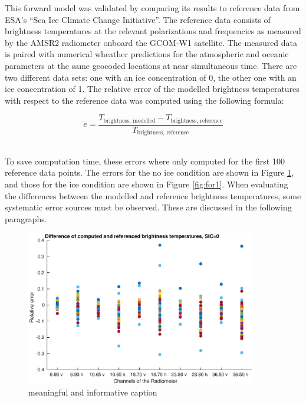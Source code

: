 \documentclass[11pt, a4paper]{article}
\begin{document}
This forward model was validated by comparing its results to reference data from ESA's ``Sea Ice Climate Change Initiative''. The reference data consists of brightness temperatures at the relevant polarizations and frequencies as measured by the AMSR2 radiometer onboard the GCOM-W1 satellite. %
The measured data is paired with numerical wheather predictions for the atmospheric and oceanic parameters at the same geocoded locations at near simultaneous time. There are two different data sets: one with an ice concentration of 0, the other one with an ice concentration of 1. The relative error of the modelled brightness temperatures with respect to the reference data was computed using the following formula:

\begin{equation}
e = \frac{T_\text{brightness, modelled} - T_\text{brightness, reference}}{T_\text{brightness, reference}}
\end{equation}

\ \\
To save computation time, these errors where only computed for the first 100 reference data points. The errors for the no ice condition are shown in Figure \ref{fig:for0}, and those for the ice condition are shown in Figure \ref{fig:for1}. When evaluating the differences between the modelled and reference brightness temperatures, some systematic error sources must be observed. These are discussed in the following paragraphs.
\newline

\begin{figure}[h]
   \centering
   \includegraphics[width=0.9\textwidth]{ValidationForward_SIC0.eps}
   \caption{meaningful and informative caption}
   \label{fig:for0}
\end{figure}
\end{document}
